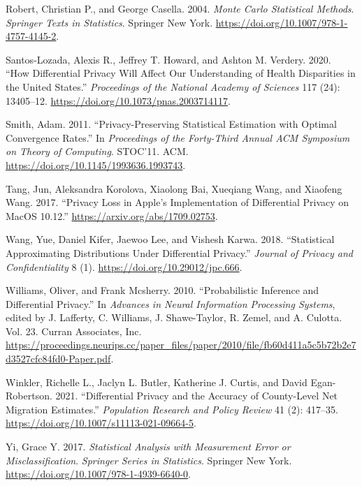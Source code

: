 \begin{CSLReferences}{1}{0}
\leavevmode{}%
Robert, Christian P., and George Casella. 2004. \emph{Monte Carlo Statistical Methods}. \emph{Springer Texts in Statistics}. Springer New York. \url{https://doi.org/10.1007/978-1-4757-4145-2}.

\leavevmode{}%
Santos-Lozada, Alexis R., Jeffrey T. Howard, and Ashton M. Verdery. 2020. {``How Differential Privacy Will Affect Our Understanding of Health Disparities in the United States.''} \emph{Proceedings of the National Academy of Sciences} 117 (24): 13405--12. \url{https://doi.org/10.1073/pnas.2003714117}.

\leavevmode{}%
Smith, Adam. 2011. {``Privacy-Preserving Statistical Estimation with Optimal Convergence Rates.''} In \emph{Proceedings of the Forty-Third Annual ACM Symposium on Theory of Computing}. STOC'11. ACM. \url{https://doi.org/10.1145/1993636.1993743}.

\leavevmode{}%
Tang, Jun, Aleksandra Korolova, Xiaolong Bai, Xueqiang Wang, and Xiaofeng Wang. 2017. {``Privacy Loss in Apple's Implementation of Differential Privacy on MacOS 10.12.''} \url{https://arxiv.org/abs/1709.02753}.

\leavevmode{}%
Wang, Yue, Daniel Kifer, Jaewoo Lee, and Vishesh Karwa. 2018. {``Statistical Approximating Distributions Under Differential Privacy.''} \emph{Journal of Privacy and Confidentiality} 8 (1). \url{https://doi.org/10.29012/jpc.666}.

\leavevmode{}%
Williams, Oliver, and Frank Mcsherry. 2010. {``Probabilistic Inference and Differential Privacy.''} In \emph{Advances in Neural Information Processing Systems}, edited by J. Lafferty, C. Williams, J. Shawe-Taylor, R. Zemel, and A. Culotta. Vol. 23. Curran Associates, Inc. \url{https://proceedings.neurips.cc/paper_files/paper/2010/file/fb60d411a5c5b72b2e7d3527cfc84fd0-Paper.pdf}.

\leavevmode{}%
Winkler, Richelle L., Jaclyn L. Butler, Katherine J. Curtis, and David Egan-Robertson. 2021. {``Differential Privacy and the Accuracy of County-Level Net Migration Estimates.''} \emph{Population Research and Policy Review} 41 (2): 417--35. \url{https://doi.org/10.1007/s11113-021-09664-5}.

\leavevmode{}%
Yi, Grace Y. 2017. \emph{Statistical Analysis with Measurement Error or Misclassification}. \emph{Springer Series in Statistics}. Springer New York. \url{https://doi.org/10.1007/978-1-4939-6640-0}.

\end{CSLReferences}


